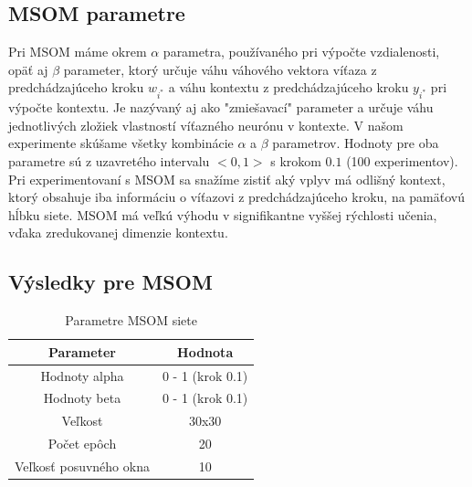 \subsection{MSOM parametre}
Pri MSOM máme okrem $\alpha$ parametra, používaného pri výpočte vzdialenosti, opäť aj $\beta$ parameter, ktorý určuje váhu
váhového vektora víťaza z predchádzajúceho kroku $w_{i^{*}}$ a váhu kontextu
z predchádzajúceho kroku $y_{i^{*}}$ pri výpočte kontextu. Je nazývaný aj ako "zmiešavací" parameter
a určuje váhu jednotlivých zložiek vlastností víťazného neurónu v kontexte.
V našom experimente skúšame všetky kombinácie $\alpha$ a $\beta$ parametrov.
Hodnoty pre oba parametre sú z uzavretého intervalu $<0, 1>$ s krokom $0.1$ (100 experimentov).
Pri experimentovaní s MSOM sa snažíme zistiť aký vplyv má odlišný kontext, ktorý obsahuje iba informáciu
o víťazovi z predchádzajúceho kroku, na pamäťovú hĺbku siete. MSOM má veľkú výhodu v signifikantne 
vyššej rýchlosti učenia, vďaka zredukovanej dimenzie kontextu.

\subsection{Výsledky pre MSOM}

\begin{table}[h!]
    \centering
    \begin{tabular}{|c|c|} 
     \hline
     Parameter & Hodnota \\ 
     \hline\hline
     Hodnoty alpha & 0 - 1 (krok 0.1)  \\ 
     \hline
     Hodnoty beta & 0 - 1  (krok 0.1) \\ 
     \hline
     Veľkost & 30x30  \\
     \hline
     Počet epôch & 20  \\
     \hline
     Veľkosť posuvného okna & 10  \\
     \hline
    \end{tabular}
    \caption{Parametre MSOM siete}
    \label{table:1}
    \end{table}
    
